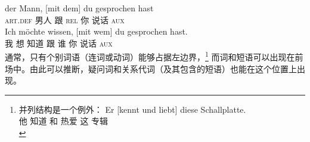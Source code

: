 \eal
\ex 
\gll der Mann,         [mit dem] du gesprochen hast\\
     \textsc{art}.\textsc{def} 男人 \spacebr{}跟 \textsc{rel} 你 说话 \textsc{aux}\\
\ex 
\gll Ich möchte wissen, [mit wem] du gesprochen hast.\\
     我 想 知道 \spacebr{}跟 谁 你 说话 \textsc{aux}\\
\zl
通常，只有个别词语（连词或动词）能够占据左边界，\footnote{%
 并列结构是一个例外：
\ea
\gll Er [kennt und liebt] diese Schallplatte.\\
     他 \spacebr{}知道 和 热爱 这 专辑\\
\z
} 
而词和短语可以出现在前场中。由此可以推断，疑问词和关系代词（及其包含的短语）也能在这个位置上出现。

